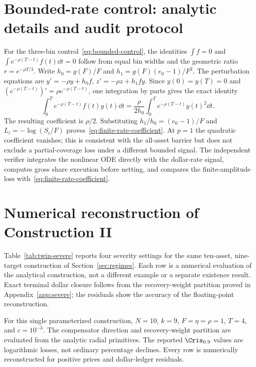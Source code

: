 \documentclass[review,hidelinks,onefignum,onetabnum]{siamonline250211}
\begin{document}
\section{Bounded-rate control: analytic details and audit protocol}\label{app:rate}
For the three-bin control~\eqref{eq:bounded-control}, the identities $\int f=0$ and $\int e^{-\rho(T-t)}f(t)\dd t=0$ follow from equal bin widths and the geometric ratio $r=e^{-\rho T/3}$. Write $h_0=g(F)/F$ and $h_1=g(F)(e_0-1)/F^2$. The perturbation equations are $y'=-\rho y+h_0 f$, $z'=-\rho z+h_1fy$. Since $y(0)=y(T)=0$ and $(e^{-\rho(T-t)})'=\rho e^{-\rho(T-t)}$, one integration by parts gives the exact identity
\begin{equation}\label{eq:ibp}
\int_0^T e^{-\rho(T-t)}f(t)y(t)\dd t
=\frac{\rho}{2h_0}\int_0^T e^{-\rho(T-t)}y(t)^2\dd t.
\end{equation}
The resulting coefficient is $\rho/2$. Substituting $h_1/h_0=(e_0-1)/F$ and $L_i=-\log(S_i/F)$ proves~\eqref{eq:finite-rate-coefficient}. At $p=1$ the quadratic coefficient vanishes; this is consistent with the all-asset barrier but does not exclude a partial-coverage loss under a different bounded signal. The independent verifier integrates the nonlinear ODE directly with the dollar-rate signal, computes gross share execution before netting, and compares the finite-amplitude loss with~\eqref{eq:finite-rate-coefficient}.

\section{Numerical reconstruction of Construction II}\label{app:numerics}
Table~\ref{tab:twin-severe} reports four severity settings for the same ten-asset, nine-target construction of Section~\ref{sec:regimes}. Each row is a numerical evaluation of the analytical construction, not a different example or a separate existence result. Exact terminal dollar closure follows from the recovery-weight partition proved in Appendix~\ref{app:severe}; the residuals show the accuracy of the floating-point reconstruction.

For this single parameterized construction, $N=10$, $k=9$,
$F=\eta=\rho=1$, $T=4$, and $c=10^{-3}$.
The compensator direction and recovery-weight partition
are evaluated from the analytic radial primitives.
The reported $\Cris_{0.9}$ values are logarithmic losses,
not ordinary percentage declines. Every row is numerically
reconstructed for positive prices and dollar-ledger residuals.
\end{document}
